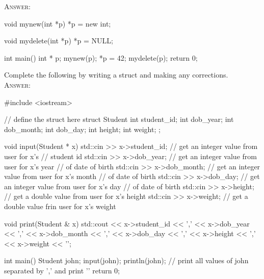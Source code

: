 \textsc{Answer:}\vspace{-3mm}
\begin{answercode}
void mynew(int *p)
{
  *p = new int;
}

void mydelete(int *p)
{
  *p = NULL;
}

int main()
{
    int * p;
    mynew(p);
    *p = 42;
    mydelete(p);
    return 0;
}
\end{answercode}

\newpage
\nextq
Complete the following by writing a struct and making any corrections.
\\
\textsc{Answer:}\vspace{-2mm}
\begin{answercode}
#include <iostream>

// define the struct here
struct Student
{
  int student_id;
  int dob_year;
  int dob_month;
  int dob_day;
  int height;
  int weight;
};


void input(Student * x)
{
    std::cin >> x->student_id; // get an integer value from user for x's 
                              // student id
    std::cin >> x->dob_year;   // get an integer value from user for x's year 
                              // of date of birth
    std::cin >> x->dob_month;  // get an integer value from user for x's month 
                              // of date of birth
    std::cin >> x->dob_day;    // get an integer value from user for x's day 
                              // of date of birth
    std::cin >> x->height;     // get a double value from user for x's height
    std::cin >> x->weight;     // get a double value frin user for x's weight
}


void print(Student & x)
{
  std::cout << x->student_id << ','
            << x->dob_year << ','
            << x->dob_month << ','
            << x->dob_day << ','
            << x->height << ','
            << x->weight << '\n';
}


int main()
{
    Student john;
    input(john);
    println(john); // print all values of john separated by ',' and print '\n'
    return 0;
}
\end{answercode}

